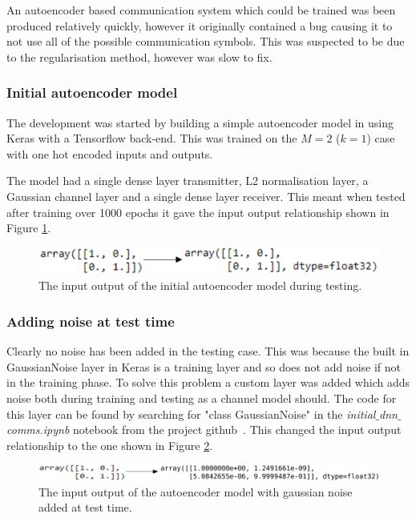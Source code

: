 \documentclass[12pt,onecolumn,letterpaper]{article}
\newcommand{\code}{\textit}
\begin{document}
An autoencoder based communication system which could be trained was been produced relatively quickly, however it originally contained a bug causing it to not use all of the possible communication symbols. This was suspected to be due to the regularisation method, however was slow to fix.

\subsubsection{Initial autoencoder model}

The development was started by building a simple autoencoder model in using Keras with a Tensorflow back-end. This was trained on the $M=2$ ($k=1$) case with one hot encoded inputs and outputs. 

The model had a single dense layer transmitter, L2 normalisation layer, a Gaussian channel layer and a single dense layer receiver. This meant when tested after training over 1000 epochs it gave the input output relationship shown in Figure \ref{fig:CodeInitialOutput}.

\begin{figure}[t]
   \centering
   \includegraphics[width=0.8\linewidth]{figures/initial_ae_output.png}
   \caption{The input output of the initial autoencoder model during testing. }
\label{fig:CodeInitialOutput}
\end{figure}

\subsubsection{Adding noise at test time}

Clearly no noise has been added in the testing case. This was because the built in GaussianNoise layer in Keras is a training layer and so does not add noise if not in the training phase. To solve this problem a custom layer was added which adds noise both during training and testing as a channel model should. The code for this layer can be found by searching for "class GaussianNoise" in the \code{initial$\_$dnn$\_$comms.ipynb} notebook from the project github~\cite{AwGithub}. This changed the input output relationship to the one shown in Figure \ref{fig:CodeGaussianNoise2}.

\begin{figure}[t]
   \centering
   \includegraphics[width=0.8\linewidth]{figures/ae1_1_with_noise.png}
   \caption{The input output of the autoencoder model with gaussian noise added at test time. }
\label{fig:CodeGaussianNoise2}
\end{figure}
\end{document}
